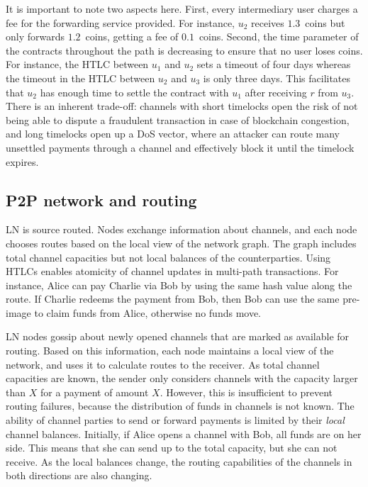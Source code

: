 It is important to note two aspects here.
First, every intermediary user charges a fee for the forwarding service provided. 
For instance, $u_2$ receives $1.3$~coins but only forwards $1.2$~coins, getting a fee of $0.1$~coins. 
Second, the time parameter of the contracts throughout the path is decreasing to ensure that no user loses coins. 
For instance, the HTLC between $u_1$ and $u_2$ sets a timeout of four days 
whereas the timeout in the HTLC between $u_2$ and $u_3$ is only three days.
This facilitates that 
$u_2$ has enough time to settle the contract with $u_1$ after receiving $r$ from $u_3$.
There is an inherent trade-off: channels with short timelocks open the risk of not being able to dispute a fraudulent transaction in case of blockchain congestion, and long timelocks open up a DoS vector, where an attacker can route many unsettled payments through a channel and effectively block it until the timelock expires.

\subsection{P2P network and routing}
LN is source routed.
Nodes exchange information about channels, and each node chooses routes based on the local view of the network graph.
The graph includes total channel capacities but not local balances of the counterparties.
Using HTLCs enables atomicity of channel updates in multi-path transactions.
For instance, Alice can pay Charlie via Bob by using the same hash value along the route.
If Charlie redeems the payment from Bob, then Bob can use the same pre-image to claim funds from Alice, otherwise no funds move.

LN nodes gossip about newly opened channels that are marked as available for routing.
Based on this information, each node maintains a local view of the network, and uses it to calculate routes to the receiver.
As total channel capacities are known, the sender only considers channels with the capacity larger than $X$ for a payment of amount $X$.
However, this is insufficient to prevent routing failures, because the distribution of funds in channels is not known.
The ability of channel parties to send or forward payments is limited by their \textit{local} channel balances.
Initially, if Alice opens a channel with Bob, all funds are on her side.
This means that she can send up to the total capacity, but she can not receive.
As the local balances change, the routing capabilities of the channels in both directions are also changing.

